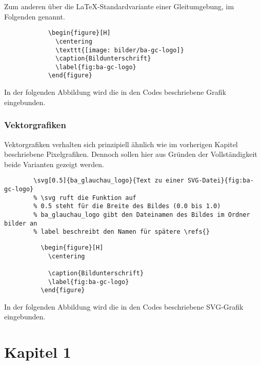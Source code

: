         Zum anderen über die \LaTeX-Standardvariante einer Gleitumgebung, im Folgenden  genannt.

        \begin{code}[H]
          \begin{verbatim}
            \begin{figure}[H]
              \centering 
              \texttt{[image: bilder/ba-gc-logo]}
              \caption{Bildunterschrift}
              \label{fig:ba-gc-logo}
            \end{figure}
          \end{verbatim}
          \caption{Grafiken mittels Environments einfügen}
          \label{code:bild-einfuegen2}
        \end{code}

        In der folgenden Abbildung wird die in den Codes beschriebene Grafik eingebunden.

  \subsubsection{Vektorgrafiken}
    \label{sec:vectorgrafiken}
    Vektorgrafiken verhalten sich prinzipiell ähnlich wie im vorherigen Kapitel beschriebene Pixelgrafiken.
    Dennoch sollen hier aus Gründen der Vollständigkeit beide Varianten gezeigt werden.

    \begin{code}[H]
      \begin{verbatim}
        \svg[0.5]{ba_glauchau_logo}{Text zu einer SVG-Datei}{fig:ba-gc-logo}
        % \svg ruft die Funktion auf
        % 0.5 steht für die Breite des Bildes (0.0 bis 1.0)
        % ba_glauchau_logo gibt den Dateinamen des Bildes im Ordner bilder an
        % label beschreibt den Namen für spätere \refs{}
      \end{verbatim}
      \caption{SVG-Grafiken mittels Bild-Funktion einbinden}
      \label{code:svg-einfuegen1}
      \end{code}

      \begin{code}[H]
        \begin{verbatim}
          \begin{figure}[H]
            \centering
            
            \caption{Bildunterschrift}
            \label{fig:ba-gc-logo}
          \end{figure}
        \end{verbatim}
        \caption{SVG-Grafiken mittels Environments einfügen}
        \label{code:bildsvg-einfuegen2}
      \end{code}

      In der folgenden Abbildung wird die in den Codes beschriebene SVG-Grafik eingebunden.

\section{Kapitel 1}
  \blindtext
